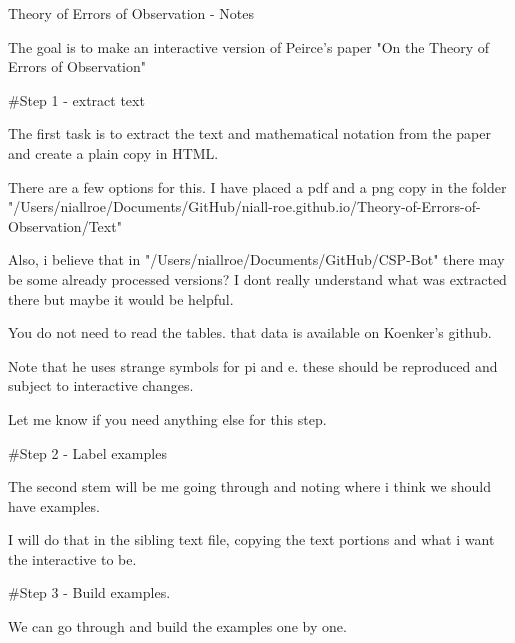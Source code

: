 Theory of Errors of Observation - Notes

The goal is to make an interactive version of Peirce's paper "On the Theory of Errors of Observation"

#Step 1 - extract text

The first task is to extract the text and mathematical notation from the paper and create a plain copy in HTML.

 There are a few options for this. I have placed a pdf and a png copy in the folder "/Users/niallroe/Documents/GitHub/niall-roe.github.io/Theory-of-Errors-of-Observation/Text"

Also, i believe that in "/Users/niallroe/Documents/GitHub/CSP-Bot" there may be some already processed versions? I dont really understand what was extracted there but maybe it would be helpful. 

You do not need to read the tables. that data is available on Koenker's github. 

Note that he uses strange symbols for pi and e. these should be reproduced and subject to interactive changes. 

Let me know if you need anything else for this step. 


#Step 2 - Label examples

The second stem will be me going through and noting where i think we should have examples. 

I will do that in the sibling text file, copying the text portions and what i want the interactive to be. 

#Step 3 - Build examples. 

We can go through and build the examples one by one. 

